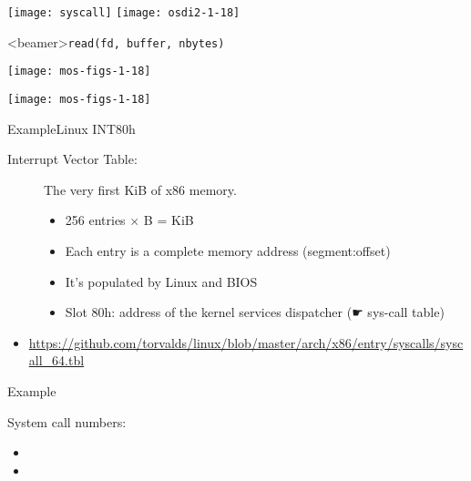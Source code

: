 \begin{center}
  \texttt{[image: syscall]}\quad
  \texttt{[image: osdi2-1-18]}
\end{center}


\begin{frame}<beamer>{\texttt{read(fd, buffer, nbytes)}}
  \begin{minipage}{.3\linewidth}
  \end{minipage}\quad
  \begin{minipage}{.65\linewidth}
    \texttt{[image: mos-figs-1-18]}
  \end{minipage}
\end{frame}

\begin{center}
  \texttt{[image: mos-figs-1-18]}
\end{center}  

\begin{frame}{Example}{Linux INT80h}
  \begin{description}
  \item[Interrupt Vector Table:] The very first \unit[1]{KiB} of x86 memory. 
    \begin{itemize} 
    \item 256 entries $\times$ \unit[4]{B} = \unit[1]{KiB}
    \item Each entry is a complete memory address (segment:offset)
    \item It's populated by Linux and BIOS
    \item Slot 80h: address of the kernel services dispatcher (☛ sys-call table)
    \end{itemize}
  \end{description}
\end{frame}

\begin{itemize}
\item \url{https://github.com/torvalds/linux/blob/master/arch/x86/entry/syscalls/syscall_64.tbl}
\end{itemize}

\begin{frame}{Example}
  \begin{center}
  \end{center}
  System call numbers:
  \begin{itemize}
  \item[] 
  \item[] 
  \end{itemize}
\end{frame}

